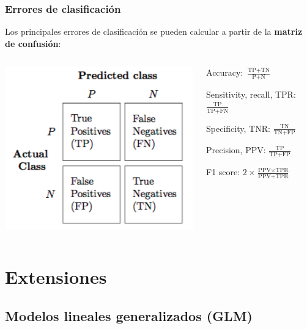 \documentclass{beamer}
\newenvironment{wideitemize}{\itemize\addtolength{\itemsep}{12pt}}{\enditemize}
\begin{document}
\begin{frame}
\frametitle{Errores de clasificación}

Los principales errores de clasificación se pueden calcular a partir de la \textbf{matriz de confusión}:
\vfill
\begin{columns}[T] %
\begin{column}{.40\textwidth}
\includegraphics[scale=0.5]{confusion_matrix.png}
\end{column}%
\hfill%
\begin{column}{.56\textwidth}
\begin{wideitemize}
\item[] Accuracy: $\frac{\text{TP} + \text{TN}}{\text{P} + \text{N}}$

\item[] Sensitivity, recall, TPR: $\frac{\text{TP}}{\text{TP} + \text{FN}}$

\item[] Specificity, TNR: $\frac{\text{TN}}{\text{TN} + \text{FP}}$

\item[] Precision, PPV: $\frac{\text{TP}}{\text{TP} + \text{FP}}$

\item[] F1 score: $2\times \frac{\text{PPV} \times \text{TPR}}{\text{PPV} + \text{TPR}}$
\end{wideitemize}
\end{column}%
\end{columns}
\end{frame}


\section{Extensiones}

\subsection{Modelos lineales generalizados (GLM)}
\end{document}

